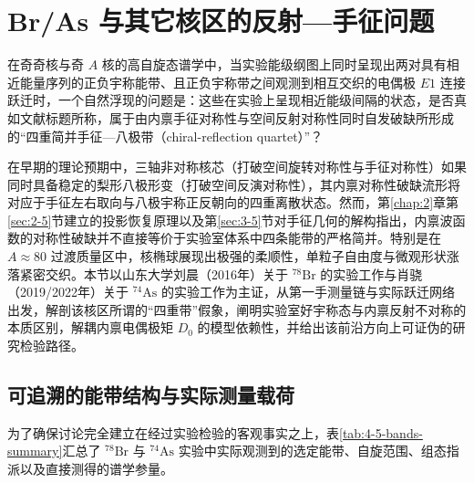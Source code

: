 \section{Br/As 与其它核区的反射---手征问题}\label{sec:4-5}

在奇奇核与奇 $A$ 核的高自旋态谱学中，当实验能级纲图上同时呈现出两对具有相近能量序列的正负宇称能带、且正负宇称带之间观测到相互交织的电偶极 $E1$ 连接跃迁时，一个自然浮现的问题是：这些在实验上呈现相近能级间隔的状态，是否真如文献标题所称，属于由内禀手征对称性与空间反射对称性同时自发破缺所形成的“四重简并手征---八极带（chiral-reflection quartet）”？

在早期的理论预期中，三轴非对称核芯（打破空间旋转对称性与手征对称性）如果同时具备稳定的梨形八极形变（打破空间反演对称性），其内禀对称性破缺流形将对应于手征左右取向与八极宇称正反朝向的四重离散状态。然而，第\ref{chap:2}章第\ref{sec:2-5}节建立的投影恢复原理以及第\ref{sec:3-5}节对手征几何的解构指出，内禀波函数的对称性破缺并不直接等价于实验室体系中四条能带的严格简并。特别是在 $A \approx 80$ 过渡质量区中，核椭球展现出极强的柔顺性，单粒子自由度与微观形状涨落紧密交织。本节以山东大学刘晨（2016年）关于 $^{78}\mathrm{Br}$ 的实验工作与肖骁（2019/2022年）关于 $^{74}\mathrm{As}$ 的实验工作为主证，从第一手测量链与实际跃迁网络出发，解剖该核区所谓的“四重带”假象，阐明实验室好宇称态与内禀反射不对称的本质区别，解耦内禀电偶极矩 $D_0$ 的模型依赖性，并给出该前沿方向上可证伪的研究检验路径。\cite{liu_2016_EvidenceOctupole,liu_2016_78br_thesis,xiao_2022_Chiralityoctupole,xiao_2019_74as_thesis,butler_1996_octupole_shapes}

\subsection{可追溯的能带结构与实际测量载荷}\label{sec:4-5-1}

为了确保讨论完全建立在经过实验检验的客观事实之上，表\ref{tab:4-5-bands-summary}汇总了 $^{78}\mathrm{Br}$ 与 $^{74}\mathrm{As}$ 实验中实际观测到的选定能带、自旋范围、组态指派以及直接测得的谱学参量。\cite{liu_2016_EvidenceOctupole,liu_2016_78br_thesis,xiao_2022_Chiralityoctupole,xiao_2019_74as_thesis}

